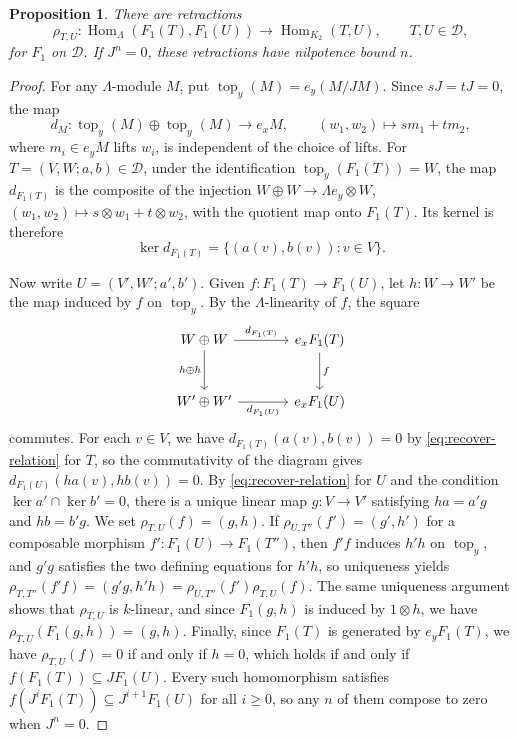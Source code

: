 \documentclass[a4paper,reqno,10pt]{amsart}
\newtheorem{proposition}[theorem]{Proposition}
\theoremstyle{definition}
\DeclareMathOperator{\Hom}{Hom}
\newcommand{\D}{\mathcal D}
\numberwithin{equation}{section}
\begin{document}
\begin{proposition}\label{prop:quotient-control}
There are retractions
\[
 \rho_{T,U}:\Hom_\Lambda(F_1(T),F_1(U))\longrightarrow\Hom_{K_2}(T,U),
 \qquad T,U\in\D,
\]
for $F_1$ on $\D$.
If $J^n=0$, these retractions have nilpotence bound $n$.
\end{proposition}
\begin{proof}
For any $\Lambda$-module $M$, put $\operatorname{top}_y(M)=e_y(M/JM)$.
Since $sJ=tJ=0$, the map
\[
 d_M:\operatorname{top}_y(M)\oplus\operatorname{top}_y(M)\longrightarrow e_xM,
 \qquad (w_1,w_2)\longmapsto sm_1+tm_2,
\]
where $m_i\in e_yM$ lifts $w_i$, is independent of the choice of lifts.
For $T=(V,W;a,b)\in\D$, under the identification $\operatorname{top}_y(F_1(T))=W$,
the map $d_{F_1(T)}$ is the composite of the injection
$W\oplus W\to\Lambda e_y\otimes W$,
$(w_1,w_2)\mapsto s\otimes w_1+t\otimes w_2$,
with the quotient map onto $F_1(T)$.
Its kernel is therefore
\begin{equation}\label{eq:recover-relation}
 \ker d_{F_1(T)}=\{(a(v),b(v)):v\in V\}.
\end{equation}

Now write $U=(V',W';a',b')$. Given $f:F_1(T)\to F_1(U)$, let
$h:W\to W'$ be the map induced by $f$ on $\operatorname{top}_y$. By the $\Lambda$-linearity of $f$, the square
\[
\begin{tikzcd}[column sep=large,row sep=large]
 W\oplus W\arrow[r,"d_{F_1(T)}"]\arrow[d,"h\oplus h"']
 &e_xF_1(T)\arrow[d,"f"]\\
 W'\oplus W'\arrow[r,"d_{F_1(U)}"']&e_xF_1(U)
\end{tikzcd}
\]
commutes. For each $v\in V$, we have $d_{F_1(T)}(a(v),b(v))=0$ by
\eqref{eq:recover-relation} for $T$, so the commutativity of the diagram gives $d_{F_1(U)}(ha(v),hb(v))=0$.
By \eqref{eq:recover-relation} for $U$ and the condition
$\ker a'\cap\ker b'=0$, there is a unique linear map $g:V\to V'$ satisfying $ha=a'g$ and $hb=b'g$.
We set $\rho_{T,U}(f)=(g,h)$. If $\rho_{U,T''}(f')=(g',h')$ for a composable morphism $f':F_1(U)\to F_1(T'')$,
then $f'f$ induces $h'h$ on $\operatorname{top}_y$, and $g'g$ satisfies the two defining equations
for $h'h$, so uniqueness yields
$\rho_{T,T''}(f'f)=(g'g,h'h)=\rho_{U,T''}(f')\rho_{T,U}(f)$. The same uniqueness argument
shows that $\rho_{T,U}$ is $k$-linear, and since
$F_1(g,h)$ is induced by $1\otimes h$, we have $\rho_{T,U}(F_1(g,h))=(g,h)$.
Finally, since $F_1(T)$ is generated by $e_yF_1(T)$, we have $\rho_{T,U}(f)=0$ if and only if $h=0$, which holds if and only if $f(F_1(T))\subseteq JF_1(U)$.
Every such homomorphism satisfies $f(J^iF_1(T))\subseteq
J^{i+1}F_1(U)$ for all $i\ge0$, so any $n$ of them compose to zero when $J^n=0$.
\end{proof}
\end{document}
